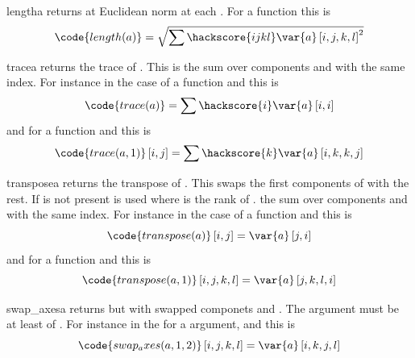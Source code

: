 \begin{funcdesc}{length}{a}
returns at Euclidean norm at each \DataSamplePoints. For a \RankFour function  this is
\begin{equation}
\code{length(a)}=\sqrt{\sum\hackscore{ijkl} \var{a} \left[i,j,k,l\right]^2}
\end{equation} 
\end{funcdesc}
\begin{funcdesc}{trace}{a}
returns the trace of . This is the sum over components  and  with the same index. For instance in the
case of a \RankTwo function and this is 
\begin{equation}
\code{trace(a)}=\sum\hackscore{i} \var{a} \left[i,i\right]
\end{equation} 
and for a \RankFour function and   this is
\begin{equation}
\code{trace(a,1)}\left[i,j\right]=\sum\hackscore{k} \var{a} \left[i,k,k,j\right]
\end{equation} 
\end{funcdesc}

\begin{funcdesc}{transpose}{a}
returns the transpose of . This swaps the first  components of  with the rest. If  is not
present  is used where  is the rank of . 
 the sum over components  and  with the same index. For instance in the
case of a \RankTwo function and this is 
\begin{equation}
\code{transpose(a)}\left[i,j\right]=\var{a} \left[j,i\right]
\end{equation} 
and for a \RankFour function and   this is
\begin{equation}
\code{transpose(a,1)}\left[i,j,k,l\right]=\var{a} \left[j,k,l,i\right]
\end{equation} 
\end{funcdesc}

\begin{funcdesc}{swap_axes}{a}
returns  but with swapped componets  and  . The argument  must be
at least of \RankTwo. For instance in the 
for a \RankFour argument,  and  this is
\begin{equation}
\code{swap_axes(a,1,2)}\left[i,j,k,l\right]=\var{a} \left[i,k,j,l\right]
\end{equation} 
\end{funcdesc}

